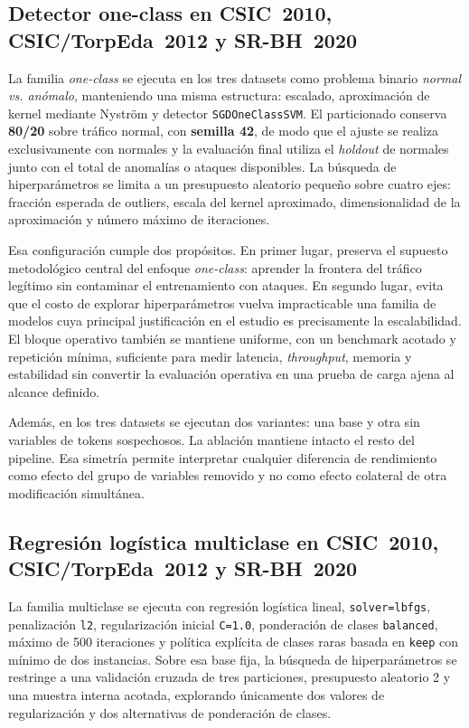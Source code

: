 \documentclass[12pt,oneside]{report}
\begin{document}
\subsection{Detector one-class en CSIC~2010, CSIC/TorpEda~2012 y SR-BH~2020}
La familia \textit{one-class} se ejecuta en los tres datasets como problema binario \textit{normal vs. anómalo}, manteniendo una misma estructura: escalado, aproximación de kernel mediante Nyström y detector \texttt{SGDOneClassSVM}. El particionado conserva \textbf{80/20} sobre tráfico normal, con \textbf{semilla 42}, de modo que el ajuste se realiza exclusivamente con normales y la evaluación final utiliza el \textit{holdout} de normales junto con el total de anomalías o ataques disponibles. La búsqueda de hiperparámetros se limita a un presupuesto aleatorio pequeño sobre cuatro ejes: fracción esperada de outliers, escala del kernel aproximado, dimensionalidad de la aproximación y número máximo de iteraciones.

Esa configuración cumple dos propósitos. En primer lugar, preserva el supuesto metodológico central del enfoque \textit{one-class}: aprender la frontera del tráfico legítimo sin contaminar el entrenamiento con ataques. En segundo lugar, evita que el costo de explorar hiperparámetros vuelva impracticable una familia de modelos cuya principal justificación en el estudio es precisamente la escalabilidad. El bloque operativo también se mantiene uniforme, con un benchmark acotado y repetición mínima, suficiente para medir latencia, \textit{throughput}, memoria y estabilidad sin convertir la evaluación operativa en una prueba de carga ajena al alcance definido.

Además, en los tres datasets se ejecutan dos variantes: una base y otra sin variables de tokens sospechosos. La ablación mantiene intacto el resto del pipeline. Esa simetría permite interpretar cualquier diferencia de rendimiento como efecto del grupo de variables removido y no como efecto colateral de otra modificación simultánea.

\subsection{Regresión logística multiclase en CSIC~2010, CSIC/TorpEda~2012 y SR-BH~2020}
La familia multiclase se ejecuta con regresión logística lineal, \texttt{solver=lbfgs}, penalización \texttt{l2}, regularización inicial \texttt{C=1.0}, ponderación de clases \texttt{balanced}, máximo de 500 iteraciones y política explícita de clases raras basada en \texttt{keep} con mínimo de dos instancias. Sobre esa base fija, la búsqueda de hiperparámetros se restringe a una validación cruzada de tres particiones, presupuesto aleatorio 2 y una muestra interna acotada, explorando únicamente dos valores de regularización y dos alternativas de ponderación de clases.
\end{document}
